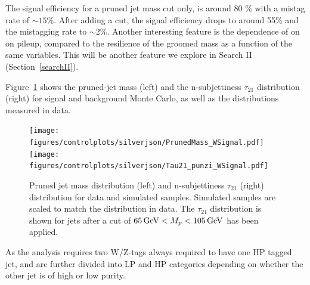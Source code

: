 The signal efficiency for a pruned jet mass cut only, is around 80 \% with a mistag rate of $\sim 15\%$. After adding a \nsubj cut, the signal efficiency drops to around 55\% and the mistagging rate to $\sim 2\%$. Another interesting feature is the dependence of \nsubj on \PT on pileup, compared to the resilience of the groomed mass as a function of the same variables. This will be another feature we explore in Search II (Section~\ref{searchII}).






Figure~\ref{fig:wtag} shows the pruned-jet mass (left) and the n-subjettiness $\tau_{21}$ distribution (right) for signal and background Monte Carlo, as well as the distributions measured in data. 

\begin{figure}[htb]
\centering
\texttt{[image: figures/controlplots/silverjson/PrunedMass\_WSignal.pdf]}
\texttt{[image: figures/controlplots/silverjson/Tau21\_punzi\_WSignal.pdf]}\\
\caption{Pruned jet mass distribution (left) and n-subjettiness $\tau_{21}$ (right) distribution for data and simulated samples. Simulated samples are scaled to match the distribution in data. The $\tau_{21}$ distribution is shown for jets after a cut of $65 {\,\text{Ge\hspace{-.08em}V}} < M_{p} < 105 {\,\text{Ge\hspace{-.08em}V}}$ has been applied.}
\label{fig:wtag}
\end{figure}

As the analysis requires two W/Z-tags always required to have one HP tagged jet, and are further divided into LP and HP categories depending on whether the other jet is of high or low purity.


